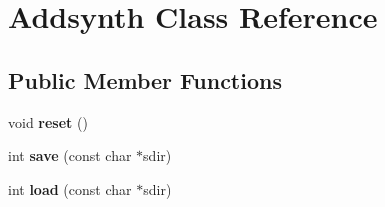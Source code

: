 \hypertarget{class_addsynth}{}\section{Addsynth Class Reference}
\label{class_addsynth}
\subsection*{Public Member Functions}
\begin{DoxyCompactItemize}
\item 
\mbox{\label{class_addsynth_a6607632594b6eea66417ece0ba2e251c}} 
void {\bfseries reset} ()
\item 
\mbox{\label{class_addsynth_a570b7942731e205eca1fc044cb2b5569}} 
int {\bfseries save} (const char $\ast$sdir)
\item 
\mbox{\label{class_addsynth_a69740a380c42fcd9e757fed33317d9aa}} 
int {\bfseries load} (const char $\ast$sdir)
\end{DoxyCompactItemize}
